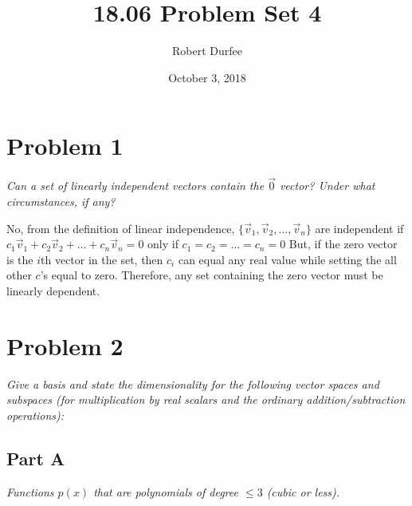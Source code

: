 \documentclass{article}
\title{18.06 Problem Set 4}
\author{Robert Durfee}
\date{October 3, 2018}
\begin{document}
\maketitle

\section*{Problem 1}

\textit{Can a set of linearly independent vectors contain the $\vec{0}$
vector? Under what circumstances, if any?}

\bigbreak

No, from the definition of linear independence, $ \{ \vec{v}_1, \vec{v}_2,
\ldots, \vec{v}_n \} $ are independent if $ c_1 \vec{v}_1 + c_2 \vec{v}_2 +
\ldots + c_n \vec{v}_n = 0 $ only if $ c_1 = c_2 = \ldots = c_n = 0 $ But, if
the zero vector is the $ i $th vector in the set, then $c_i$ can equal any
real value while setting the all other $c$'s equal to zero. Therefore, any
set containing the zero vector must be linearly dependent.

\section*{Problem 2}

\textit{Give a basis and state the dimensionality for the following vector
spaces and subspaces (for multiplication by real scalars and the ordinary
addition/subtraction operations):}

\subsection*{Part A}

\textit{Functions $p(x)$ that are polynomials of degree $ \leq 3 $ (cubic or
less).}

\bigbreak
\end{document}
